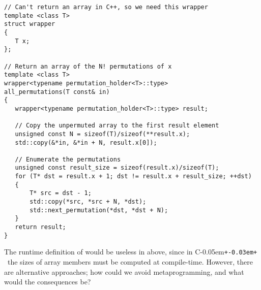 \documentclass{netobjectdays}
\newcommand{\Cpp}{C\kern-0.05em\texttt{+\kern-0.03em+}%
}
\newcommand{\mping}{meta\-program\-ming}
\begin{document}
{\footnotesize
\begin{verbatim}
// Can't return an array in C++, so we need this wrapper
template <class T>
struct wrapper
{
   T x;
};

// Return an array of the N! permutations of x
template <class T>
wrapper<typename permutation_holder<T>::type>
all_permutations(T const& in)
{
   wrapper<typename permutation_holder<T>::type> result;

   // Copy the unpermuted array to the first result element
   unsigned const N = sizeof(T)/sizeof(**result.x);
   std::copy(&*in, &*in + N, result.x[0]);

   // Enumerate the permutations
   unsigned const result_size = sizeof(result.x)/sizeof(T);
   for (T* dst = result.x + 1; dst != result.x + result_size; ++dst)
   {
       T* src = dst - 1;
       std::copy(*src, *src + N, *dst);
       std::next_permutation(*dst, *dst + N);
   }
   return result;
}
\end{verbatim}
}



The runtime definition of  would be useless in
 above, since in \Cpp\ the sizes of array
members must be computed at compile-time. However, there are
alternative approaches; how could we avoid \mping, and what would the
consequences be?
\end{document}
